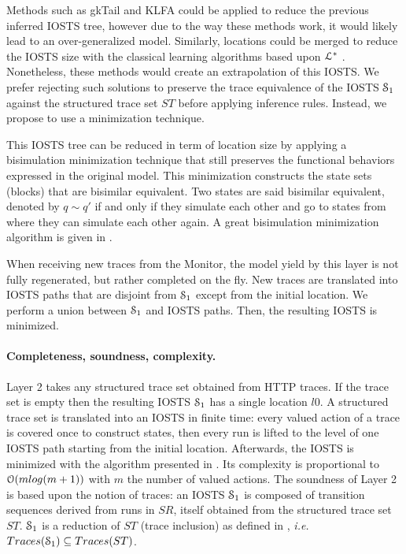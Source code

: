 Methods such as gkTail and KLFA could be applied to reduce the
previous inferred IOSTS tree, however due to the way these
methods work, it would likely lead to an over-generalized model.
Similarly, locations could be merged to reduce the IOSTS size
with the classical learning algorithms based upon
$\EuScript{L}^*$ \cite{Angluin198787,lambeau08}. Nonetheless,
these methods would create an extrapolation of this IOSTS. We
prefer rejecting such solutions to preserve the trace equivalence
\cite{petrenko06} of the IOSTS $\EuScript{S}_1$ against the
structured trace set $ST$ before applying inference rules.
Instead, we propose to use a minimization technique.

This IOSTS tree can be reduced in term of location size by
applying a bisimulation minimization technique
\cite{Park:1981:CAI:647210.720030} that still preserves the
functional behaviors expressed in the original model.  This
minimization constructs the state sets (blocks) that are
bisimilar equivalent. Two states are said bisimilar equivalent,
denoted by $q \sim q'$ if and only if they simulate each other
and go to states from where they can simulate each other again.
A great bisimulation minimization algorithm is given in
\cite{Fernandez89animplementation}.

When receiving new traces from the Monitor, the model yield by
this layer is not fully regenerated, but rather completed on the
fly. New traces are translated into IOSTS paths that are disjoint
from $\EuScript{S}_1$ except from the initial location. We
perform a union between $\EuScript{S}_1$ and IOSTS paths. Then,
the resulting IOSTS is minimized.

\paragraph{Completeness, soundness, complexity.}

Layer 2 takes any structured trace set obtained from HTTP traces.
If the trace set is empty then the resulting IOSTS
$\EuScript{S}_1$ has a single location $l0$. A structured trace
set is translated into an IOSTS in finite time: every valued
action of a trace is covered once to construct states, then every
run is lifted to the level of one IOSTS path starting from the
initial location. Afterwards, the IOSTS is minimized with the
algorithm presented in \cite{Fernandez89animplementation}. Its
complexity is proportional to $\EuScript{O}(mlog (m+1))$ with $m$
the number of valued actions. The soundness of Layer 2 is based
upon the notion of traces: an IOSTS $\EuScript{S}_1$ is composed
of transition sequences derived from runs in $SR$, itself
obtained from the structured trace set $ST$. $\EuScript{S}_1$ is
a reduction of $ST$ (trace inclusion) as defined in
\cite{petrenko06}, \emph{i.e.} $Traces(\EuScript{S}_1) \subseteq Traces(ST)$.

